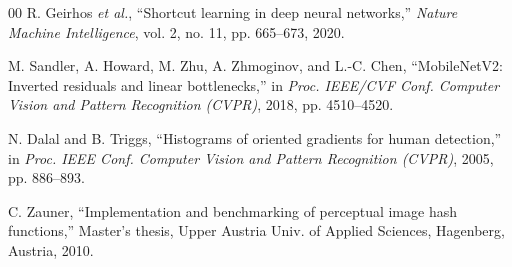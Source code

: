 \documentclass[conference]{IEEEtran}
\begin{document}
\begin{thebibliography}{00}
R. Geirhos \textit{et al.}, ``Shortcut learning in deep neural networks,'' \textit{Nature Machine Intelligence}, vol. 2, no. 11, pp. 665--673, 2020.

M. Sandler, A. Howard, M. Zhu, A. Zhmoginov, and L.-C. Chen, ``MobileNetV2: Inverted residuals and linear bottlenecks,'' in \textit{Proc. IEEE/CVF Conf. Computer Vision and Pattern Recognition (CVPR)}, 2018, pp. 4510--4520.

N. Dalal and B. Triggs, ``Histograms of oriented gradients for human detection,'' in \textit{Proc. IEEE Conf. Computer Vision and Pattern Recognition (CVPR)}, 2005, pp. 886--893.

C. Zauner, ``Implementation and benchmarking of perceptual image hash functions,'' Master's thesis, Upper Austria Univ. of Applied Sciences, Hagenberg, Austria, 2010.

\end{thebibliography}
\end{document}
